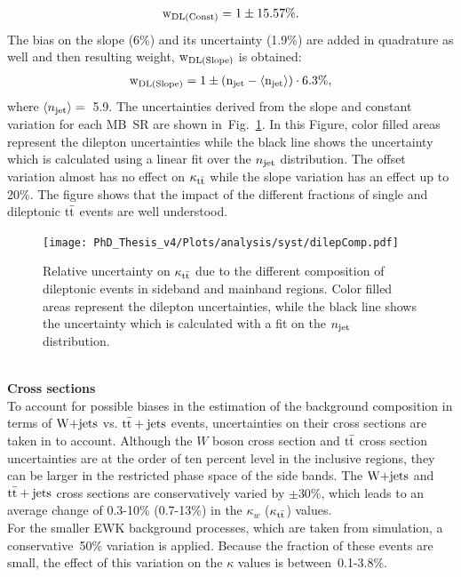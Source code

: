 \begin{eqnarray}
\rm w_{DL(Const)} = 1\pm15.57\%.
\end{eqnarray}
The bias on the slope (6\%) and its uncertainty (1.9\%) are added in quadrature as well and then resulting weight, ${\rm w_{DL(Slope)}}$ is obtained:
\begin{eqnarray}
\rm w_{DL(Slope)} = 1\pm(n_{\rm jet}-\langle n_{\rm jet} \rangle) \cdot 6.3\%,
\end{eqnarray}
where $\langle n_{\rm jet} \rangle=$~5.9.
The uncertainties derived from the slope and constant variation for each MB~SR are shown in~Fig.~\ref{fig:systDL}. In this Figure, color filled areas represent the dilepton uncertainties while the black line shows the uncertainty which is calculated using a linear fit over the $n_{\rm jet}$ distribution. The offset variation almost has no effect on $\kappa_{\rm t\bar{t}}$ while the slope variation has an effect up to 20\%. The figure shows that the impact of the different fractions of single and dileptonic $\rm t\bar{t}$ events are well understood. 
\begin{figure}[!hbt]
    \begin{center}
 \texttt{[image: PhD\_Thesis\_v4/Plots/analysis/syst/dilepComp.pdf]}
  \caption{ \label{fig:systDL} Relative uncertainty on $\kappa_{\rm t\bar{t}}$ due to the different composition of dileptonic events in sideband and mainband regions. Color filled areas represent the dilepton uncertainties, while the black line shows the uncertainty which is calculated with a fit on the $n_{\rm jet}$ distribution.}
  \end{center}
\end{figure}
\\
\textbf{Cross sections}\\
To account for possible biases in the estimation of the background composition in terms of $\textrm{W+jets}$ vs. ${\rm t\bar{t}+jets}$ events, uncertainties on their cross sections are taken in to account. Although the $W$ boson cross section and $\rm t\bar{t}$ cross section uncertainties are at the order of ten percent level in the inclusive regions, they can be larger in the restricted phase space of the side bands. The $\textrm{W+jets}$ and ${\rm t\bar{t}+jets}$ cross sections are conservatively varied by $\pm$30\%, which leads to an average change of 0.3-10\% (0.7-13\%) in the $\kappa_w$ ($\kappa_{\rm t\bar{t}}$) values. \\
For the smaller EWK background processes, which are taken from simulation, a conservative~50\% variation is applied. Because the fraction of these events are small, the effect of this variation on the $\kappa$ values is between~0.1-3.8\%.
